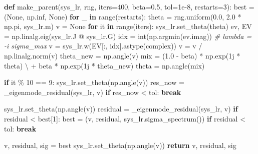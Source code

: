 \documentclass[
  a4paper,
]{ltjsarticle}
\newenvironment{Shaded}{}{}
\newcommand{\BuiltInTok}[1]{\textcolor[rgb]{0.00,0.50,0.00}{#1}}
\newcommand{\CommentTok}[1]{\textcolor[rgb]{0.38,0.63,0.69}{\textit{#1}}}
\newcommand{\ControlFlowTok}[1]{\textcolor[rgb]{0.00,0.44,0.13}{\textbf{#1}}}
\newcommand{\DecValTok}[1]{\textcolor[rgb]{0.25,0.63,0.44}{#1}}
\newcommand{\FloatTok}[1]{\textcolor[rgb]{0.25,0.63,0.44}{#1}}
\newcommand{\KeywordTok}[1]{\textcolor[rgb]{0.00,0.44,0.13}{\textbf{#1}}}
\newcommand{\NormalTok}[1]{#1}
\newcommand{\OperatorTok}[1]{\textcolor[rgb]{0.40,0.40,0.40}{#1}}
\newcommand{\OtherTok}[1]{\textcolor[rgb]{0.00,0.44,0.13}{#1}}
\newcommand{\VariableTok}[1]{\textcolor[rgb]{0.10,0.09,0.49}{#1}}
\begin{document}
\begin{Shaded}
\begin{Highlighting}[]
\KeywordTok{def}\NormalTok{ make\_parent(sys\_lr, rng, iters}\OperatorTok{=}\DecValTok{400}\NormalTok{, beta}\OperatorTok{=}\FloatTok{0.5}\NormalTok{, tol}\OperatorTok{=}\FloatTok{1e{-}8}\NormalTok{, restarts}\OperatorTok{=}\DecValTok{3}\NormalTok{):}
\NormalTok{    best }\OperatorTok{=}\NormalTok{ (}\VariableTok{None}\NormalTok{, np.inf, }\VariableTok{None}\NormalTok{)}
    \ControlFlowTok{for}\NormalTok{ \_ }\KeywordTok{in} \BuiltInTok{range}\NormalTok{(restarts):}
\NormalTok{        theta }\OperatorTok{=}\NormalTok{ rng.uniform(}\FloatTok{0.0}\NormalTok{, }\FloatTok{2.0} \OperatorTok{*}\NormalTok{ np.pi, sys\_lr.m)}
\NormalTok{        v }\OperatorTok{=} \VariableTok{None}
        \ControlFlowTok{for}\NormalTok{ it }\KeywordTok{in} \BuiltInTok{range}\NormalTok{(iters):}
\NormalTok{            sys\_lr.set\_theta(theta)}
\NormalTok{            ev, EV }\OperatorTok{=}\NormalTok{ np.linalg.eig(sys\_lr.J }\OperatorTok{@}\NormalTok{ sys\_lr.G)}
\NormalTok{            idx }\OperatorTok{=} \BuiltInTok{int}\NormalTok{(np.argmin(ev.imag))  }\CommentTok{\# lambda = {-}i sigma\_max}
\NormalTok{            v }\OperatorTok{=}\NormalTok{ sys\_lr.w(EV[:, idx].astype(}\BuiltInTok{complex}\NormalTok{))}
\NormalTok{            v }\OperatorTok{=}\NormalTok{ v }\OperatorTok{/}\NormalTok{ np.linalg.norm(v)}
\NormalTok{            theta\_new }\OperatorTok{=}\NormalTok{ np.angle(v)}
\NormalTok{            mix }\OperatorTok{=}\NormalTok{ (}\FloatTok{1.0} \OperatorTok{{-}}\NormalTok{ beta) }\OperatorTok{*}\NormalTok{ np.exp(}\OtherTok{1j} \OperatorTok{*}\NormalTok{ theta) }\OperatorTok{\textbackslash{}}
                \OperatorTok{+}\NormalTok{ beta }\OperatorTok{*}\NormalTok{ np.exp(}\OtherTok{1j} \OperatorTok{*}\NormalTok{ theta\_new)}
\NormalTok{            theta }\OperatorTok{=}\NormalTok{ np.angle(mix)}

            \ControlFlowTok{if}\NormalTok{ it }\OperatorTok{\%} \DecValTok{10} \OperatorTok{==} \DecValTok{9}\NormalTok{:}
\NormalTok{                sys\_lr.set\_theta(np.angle(v))}
\NormalTok{                res\_now }\OperatorTok{=}\NormalTok{ \_eigenmode\_residual(sys\_lr, v)}
                \ControlFlowTok{if}\NormalTok{ res\_now }\OperatorTok{\textless{}}\NormalTok{ tol:}
                    \ControlFlowTok{break}

\NormalTok{        sys\_lr.set\_theta(np.angle(v))}
\NormalTok{        residual }\OperatorTok{=}\NormalTok{ \_eigenmode\_residual(sys\_lr, v)}
        \ControlFlowTok{if}\NormalTok{ residual }\OperatorTok{\textless{}}\NormalTok{ best[}\DecValTok{1}\NormalTok{]:}
\NormalTok{            best }\OperatorTok{=}\NormalTok{ (v, residual, sys\_lr.sigma\_spectrum())}
        \ControlFlowTok{if}\NormalTok{ residual }\OperatorTok{\textless{}}\NormalTok{ tol:}
            \ControlFlowTok{break}

\NormalTok{    v, residual, sig }\OperatorTok{=}\NormalTok{ best}
\NormalTok{    sys\_lr.set\_theta(np.angle(v))}
    \ControlFlowTok{return}\NormalTok{ v, residual, sig}
\end{Highlighting}
\end{Shaded}
\end{document}
